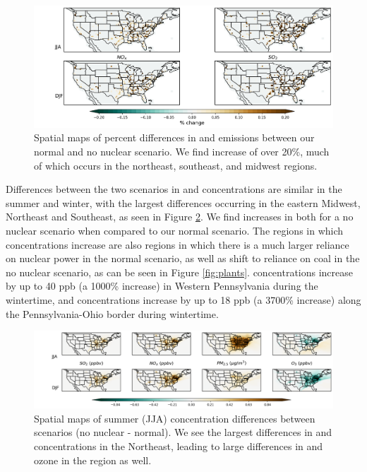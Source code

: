 \documentclass[12]{article}
\begin{document}
\begin{figure}
    \centering
    \includegraphics[scale=0.4]{ego_nonuclear_project/Figures/nox_so2_emissions.png}
    \caption{Spatial maps of percent differences in  and  emissions between our normal and no nuclear scenario. We find increase of over 20\%, much of which occurs in the northeast, southeast, and midwest regions.} 
    \label{fig:emissions_nonuc}
\end{figure}

Differences between the two scenarios in  and  concentrations are similar in the summer and winter, with the largest differences occurring in the eastern Midwest, Northeast and Southeast, as seen in Figure \ref{fig:summer_winter_dif}. We find increases in both for a no nuclear scenario when compared to our normal scenario. The regions in which concentrations increase are also regions in which there is a much larger reliance on nuclear power in the normal scenario, as well as shift to reliance on coal in the no nuclear scenario, as can be seen in Figure \ref{fig:plants}.  concentrations increase by up to 40 ppb (a 1000\% increase) in Western Pennsylvania during the wintertime, and  concentrations increase by up to 18 ppb (a 3700\% increase) along the Pennsylvania-Ohio border during wintertime. 
\begin{figure}
    \centering
    \includegraphics[scale=0.5]{ego_nonuclear_project/Figures/summer_winter_national_dif.png}
    \caption{Spatial maps of summer (JJA) concentration differences between scenarios (no nuclear - normal). We see the largest differences in  and  concentrations in the Northeast, leading to large differences in  and ozone in the region as well.} 
    \label{fig:summer_winter_dif}
\end{figure}
\end{document}
